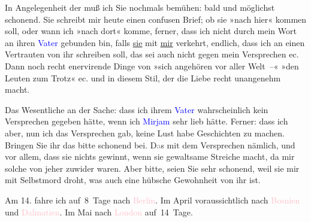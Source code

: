 \pstart
           In Angelegenheit der \label{K_L03339-3v}\label{K_L03339-3h} muß ich Sie
               nochmals bemühen: bald und möglichst schonend. Sie schreibt mir heute einen confusen Brief; ob sie »nach hier« kommen
               soll, oder wann ich »nach dort« komme, ferner, dass ich nicht durch mein Wort an
               ihren \textcolor{blue}{Vater}{}\ledrightnote{{$\rightarrow$}\textcolor{blue}{Horwitz}} gebunden bin,
               falls \uline{sie} mit \uline{mir}
               verkehrt, endlich, dass ich an einen Vertrauten von ihr schreiben soll, das sei auch
               nicht gegen mein Versprechen ec. Dann noch recht enervirende Dinge
               von »sich angehören vor aller {\pb}Welt –« »den Leuten zum Trotz« ec. und in diesem Stil, der die Liebe recht
               unangenehm macht.\pend
           
\pstart
           Das Wesentliche an der Sache: dass ich ihrem \textcolor{blue}{Vater}{}\ledrightnote{{$\rightarrow$}\textcolor{blue}{Horwitz}} wahrscheinlich kein Versprechen gegeben hätte, wenn
               ich \textcolor{blue}{Mirjam}{}\ledrightnote{\textcolor{blue}{Mirjam Horwitz}} sehr lieb hätte. Ferner: dass ich
               aber, nun ich das Versprechen gab, keine Lust habe Geschichten zu machen. Bringen Sie
               ihr das bitte schonend bei. D\textcolor{gray}{a}s mit dem Versprechen nämlich, und
               vor allem, dass sie nichts gewinnt, wenn sie gewaltsame Streiche macht, da mir solche
               von jeher zuwider waren. Aber bitte, seien Sie sehr schonend, weil sie mir mit
               Selbstmord droht, was auch eine hübsche Gewohnheit von ihr ist.\pend
           
\pstart
           Am 14. fahre ich auf 8 Tage nach \textcolor{pink}{Berlin}{}\ledrightnote{\textcolor{pink}{Berlin}}. Im April voraussichtlich
               nach \textcolor{pink}{Bosnien}{}\ledrightnote{\textcolor{pink}{Bosnien und Herzegowina}} und \textcolor{pink}{Dalmatien}{}\ledrightnote{\textcolor{pink}{Dalmatien}}. Im Mai nach \textcolor{pink}{London}{}\ledrightnote{\textcolor{pink}{London}} auf 14 Tage.\pend
           
